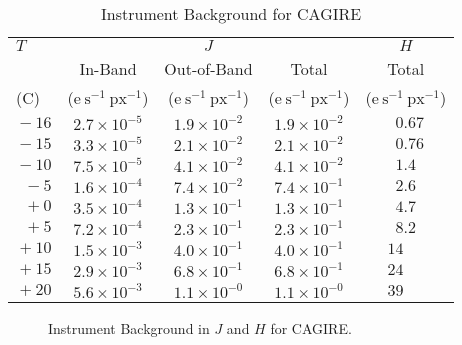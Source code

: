 \documentclass{article}
\begin{document}
\begin{table}
\caption{Instrument Background for CAGIRE}
\label{table:instrument-background}
\medskip
\begin{center}
\begin{tabular}{lcccc}
\hline
\hline
$T$&\multicolumn{3}{c}{$J$}&\multicolumn{1}{c}{$H$}
\\
\cline{2-4}
&In-Band&Out-of-Band&Total&Total\\
(C)&
($\mathrm{e}~\mathrm{s}^{-1}~\mathrm{px}^{-1}$)&
($\mathrm{e}~\mathrm{s}^{-1}~\mathrm{px}^{-1}$)&
($\mathrm{e}~\mathrm{s}^{-1}~\mathrm{px}^{-1}$)&
($\mathrm{e}~\mathrm{s}^{-1}~\mathrm{px}^{-1}$)\\
\hline
$\phantom{}-16$&$2.7 \times 10^{-5}$&$1.9 \times 10^{-2}$&$1.9 \times 10^{-2}$&$\phantom{0}0.67\phantom{}$\\
$\phantom{}-15$&$3.3 \times 10^{-5}$&$2.1 \times 10^{-2}$&$2.1 \times 10^{-2}$&$\phantom{0}0.76\phantom{}$\\
$\phantom{}-10$&$7.5 \times 10^{-5}$&$4.1 \times 10^{-2}$&$4.1 \times 10^{-2}$&$\phantom{0}1.4\phantom{0}$\\
$\phantom{0}-5$&$1.6 \times 10^{-4}$&$7.4 \times 10^{-2}$&$7.4 \times 10^{-1}$&$\phantom{0}2.6\phantom{0}$\\
$\phantom{0}+0$&$3.5 \times 10^{-4}$&$1.3 \times 10^{-1}$&$1.3 \times 10^{-1}$&$\phantom{0}4.7\phantom{0}$\\
$\phantom{0}+5$&$7.2 \times 10^{-4}$&$2.3 \times 10^{-1}$&$2.3 \times 10^{-1}$&$\phantom{0}8.2\phantom{0}$\\
$\phantom{}+10$&$1.5 \times 10^{-3}$&$4.0 \times 10^{-1}$&$4.0 \times 10^{-1}$&$\phantom{}14\phantom{.00}$\\
$\phantom{}+15$&$2.9 \times 10^{-3}$&$6.8 \times 10^{-1}$&$6.8 \times 10^{-1}$&$\phantom{}24\phantom{.00}$\\
$\phantom{}+20$&$5.6 \times 10^{-3}$&$1.1 \times 10^{-0}$&$1.1 \times 10^{-0}$&$\phantom{}39\phantom{.00}$\\
\hline
\end{tabular}
\end{center}
\end{table}

\begin{figure}
\begin{center}
\end{center}
\caption{Instrument Background in $J$ and $H$ for CAGIRE.}
\label{figure:instrument-background}
\end{figure}
\end{document}
